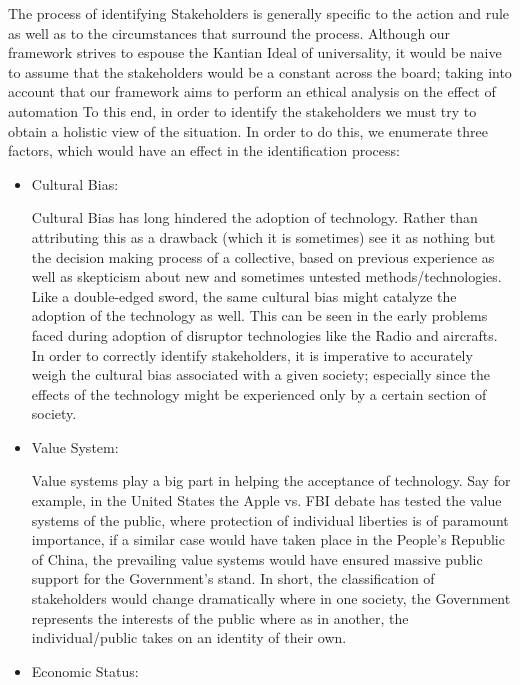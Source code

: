 The process of identifying Stakeholders is generally specific to the action and rule as well as to the circumstances that surround the process. Although our framework strives to espouse the Kantian Ideal of universality, it would be naive to assume that the stakeholders would be a constant across the board; taking into account that our framework aims to perform an ethical analysis on the effect of automation
    To this end, in order to identify the stakeholders we must try to obtain a holistic view of the situation. In order to do this, we enumerate three factors, which would have an effect in the identification process:
    \begin{itemize}
      \item Cultural Bias:	  
\begin{pointenv}
Cultural Bias has long hindered the adoption of technology. Rather than attributing this as a drawback (which it is sometimes) see it as nothing but the decision making process of a collective, based on previous experience as well as skepticism about new and sometimes untested methods/technologies. Like a double-edged sword, the same cultural bias might catalyze the adoption of the technology as well. This can be seen in the early problems faced during adoption of disruptor technologies like the Radio and aircrafts. In order to correctly identify stakeholders, it is imperative to accurately weigh the cultural bias associated with a given society; especially since the effects of the technology might be experienced only by a certain section of society.
\end{pointenv}
      \item  Value System:
\begin{pointenv}
Value systems play a big part in helping the acceptance of technology. Say for example, in the United States the Apple vs. FBI debate has tested the value systems of the public, where protection of individual liberties is of paramount importance, if a similar case would have taken place in the People's Republic of China, the prevailing value systems would have ensured massive public support for the Government's stand. In short, the classification of stakeholders would change dramatically where in one society, the Government represents the interests of the public where as in another, the individual/public takes on an identity of their own.
\end{pointenv}
      \item Economic Status:
\begin{pointenv}

\end{pointenv}
\end{itemize}

